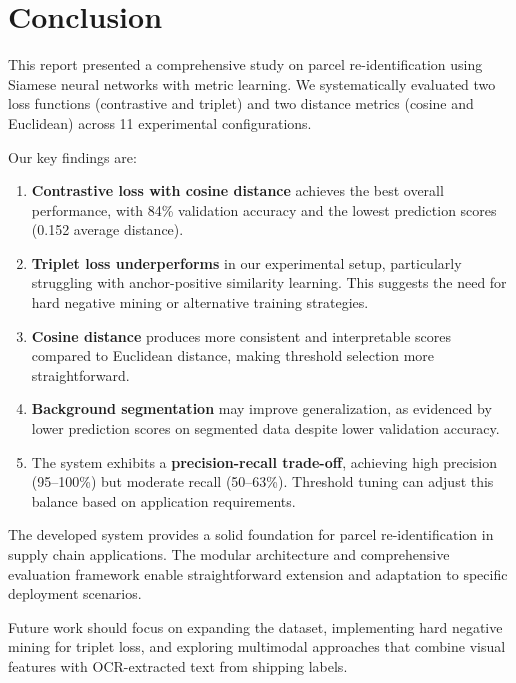 \documentclass[12pt,a4paper]{article}
\begin{document}
\section{Conclusion}
\label{sec:conclusion}

This report presented a comprehensive study on parcel re-identification using Siamese neural networks with metric learning. We systematically evaluated two loss functions (contrastive and triplet) and two distance metrics (cosine and Euclidean) across 11 experimental configurations.

Our key findings are:

\begin{enumerate}
    \item \textbf{Contrastive loss with cosine distance} achieves the best overall performance, with 84\% validation accuracy and the lowest prediction scores (0.152 average distance).
    
    \item \textbf{Triplet loss underperforms} in our experimental setup, particularly struggling with anchor-positive similarity learning. This suggests the need for hard negative mining or alternative training strategies.
    
    \item \textbf{Cosine distance} produces more consistent and interpretable scores compared to Euclidean distance, making threshold selection more straightforward.
    
    \item \textbf{Background segmentation} may improve generalization, as evidenced by lower prediction scores on segmented data despite lower validation accuracy.
    
    \item The system exhibits a \textbf{precision-recall trade-off}, achieving high precision (95--100\%) but moderate recall (50--63\%). Threshold tuning can adjust this balance based on application requirements.
\end{enumerate}

The developed system provides a solid foundation for parcel re-identification in supply chain applications. The modular architecture and comprehensive evaluation framework enable straightforward extension and adaptation to specific deployment scenarios.

Future work should focus on expanding the dataset, implementing hard negative mining for triplet loss, and exploring multimodal approaches that combine visual features with OCR-extracted text from shipping labels.
\end{document}
